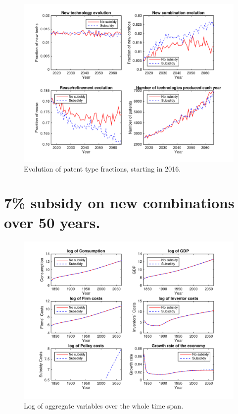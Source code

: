 \documentclass[a4paper,11pt]{article}
\begin{document}
\begin{figure}[h!]
\centering
\includegraphics[scale=.6]{figures/patents2016NT}
\caption{Evolution of patent type fractions, starting in 2016.}
\end{figure}

\clearpage

\section*{7\% subsidy on new combinations over 50 years.}

\begin{figure}[h!]
\centering
\includegraphics[scale=.6]{figures/aggregatesNC}
\caption{Log of aggregate variables over the whole time span.}
\end{figure}
\end{document}
